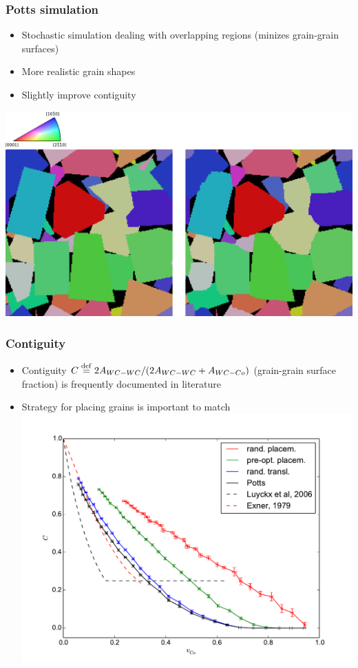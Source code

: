\documentclass[11pt]{beamer} %
\begin{document}
\begin{frame}
 \frametitle{Potts simulation}
  \begin{itemize}
   \item Stochastic simulation dealing with overlapping regions (minizes grain-grain surfaces)
   \item More realistic grain shapes
   \item Slightly improve contiguity
  \end{itemize}
  \begin{center}
   \includegraphics[trim=0 0 0 6cm,clip, width=0.9\linewidth]{v105_slice1}
  \end{center}
\end{frame}


\begin{frame}
 \frametitle{Contiguity}
  \begin{itemize}
   \item Contiguity $ C \overset{\mathrm{def}}{=} 2 A_{WC-WC} / ( 2 A_{WC-WC} + A_{WC-Co} )$ (grain-grain surface fraction) is frequently documented in literature
   \item Strategy for placing grains is important to match
   \includegraphics[width=0.75\linewidth]{contiguity}
  \end{itemize}
\end{frame}
\end{document}
